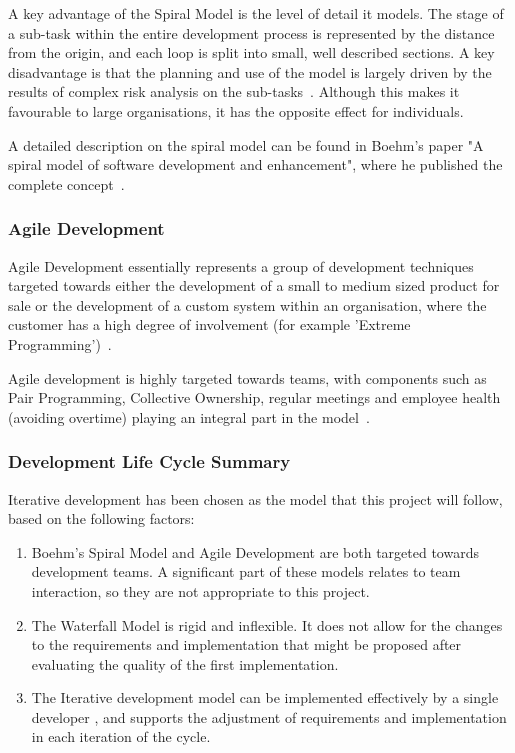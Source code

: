 \documentclass{article}
\begin{document}
A key advantage of the Spiral Model is the level of detail it models.  The stage of a sub-task within the entire development process is represented by the distance from the origin, and each loop is split into small, well described sections.  A key disadvantage is that the planning and use of the model is largely driven by the results of complex risk analysis on the sub-tasks~\cite{sommervilleSoftwareEngineering}.  Although this makes it favourable to large organisations, it has the opposite effect for individuals.

A detailed description on the spiral model can be found in Boehm's paper "A spiral model of software development and enhancement", where he published the complete concept~\cite{spiralModelSoftwareDevelopment}.

\subsubsection{Agile Development}
Agile Development essentially represents a group of development techniques targeted towards either the development of a small to medium sized product for sale or the development of a custom system within an organisation, where the customer has a high degree of involvement (for example 'Extreme Programming')~\cite{sommervilleSoftwareEngineering}.

Agile development is highly targeted towards teams, with components such as Pair Programming, Collective Ownership, regular meetings and employee health (avoiding overtime) playing an integral part in the model~\cite{sommervilleSoftwareEngineering}.

\subsubsection{Development Life Cycle Summary}
\label{sec:developmentLifeCycleSummary}
Iterative development has been chosen as the model that this project will follow, based on the following factors:
\begin{enumerate}
  \item Boehm's Spiral Model and Agile Development are both targeted towards development teams.  A significant part of these models relates to team interaction, so they are not appropriate to this project.
  \item The Waterfall Model is rigid and inflexible.  It does not allow for the changes to the requirements and implementation that might be proposed after evaluating the quality of the first implementation.
  \item The Iterative development model can be implemented effectively by a single developer , and supports the adjustment of requirements and implementation in each iteration of the cycle.
\end{enumerate}
\end{document}
